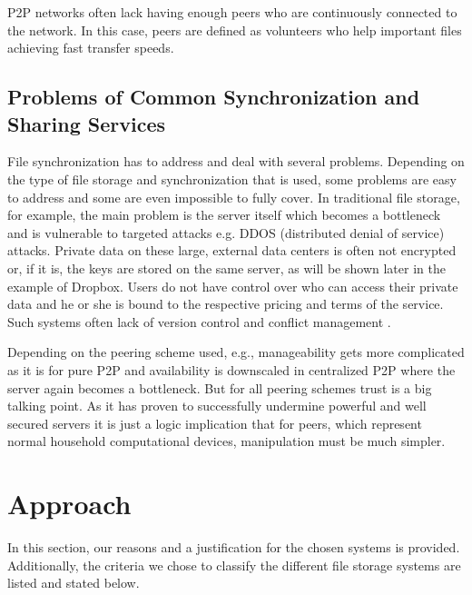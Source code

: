 P2P networks often lack having enough peers who are continuously connected to the network. In this case, peers are defined as volunteers who help important files achieving fast transfer speeds.

\subsection{Problems of Common Synchronization and Sharing Services}
File synchronization has to address and deal with several problems. Depending on the type of file storage and synchronization that is used, some problems are easy to address and some are even impossible to fully cover. In traditional file storage, for example, the main problem is the server itself which becomes a bottleneck and is vulnerable to targeted attacks e.g. DDOS (distributed denial of service) attacks. Private data on these large, external data centers is often not encrypted or, if it is, the keys are stored on the same server, as will be shown later in the example of Dropbox. Users do not have control over who can access their private data and he or she is bound to the respective pricing and terms of the service. Such systems often lack of version control and conflict management \cite{hive2hive}.

Depending on the peering scheme used, e.g., manageability gets more complicated as it is for pure P2P and availability is downscaled in centralized P2P where the server again becomes a bottleneck. But for all peering schemes trust is a big talking point. As it has proven to successfully undermine powerful and well secured servers it is just a logic implication that for peers, which represent normal household computational devices, manipulation must be much simpler.

\section{Approach}
\label{sec:approach}
In this section, our reasons and a justification for the chosen systems is provided. Additionally, the criteria we chose to classify the different file storage systems are listed and stated below.

